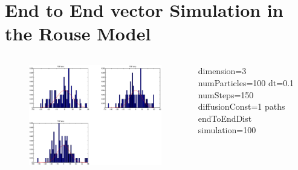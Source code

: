 \documentclass {beamer}
\begin{document}
\section{End to End vector Simulation in the Rouse Model}
\begin{frame}
	\begin{columns}
		\begin{column}{0.5\textwidth}
		\begin{figure}
		\includegraphics[width=1.3\textwidth]{PDF.eps}
		\end{figure}		
		\end{column}
		\begin{column}{0.3\textwidth}
		dimension=3
		numParticles=100
		dt=0.1
		numSteps=150
		diffusionConst=1
		paths %
		endToEndDist %
		simulation=100
		\end{column}
		\end{columns}
     	\end{frame}
\end{document}
